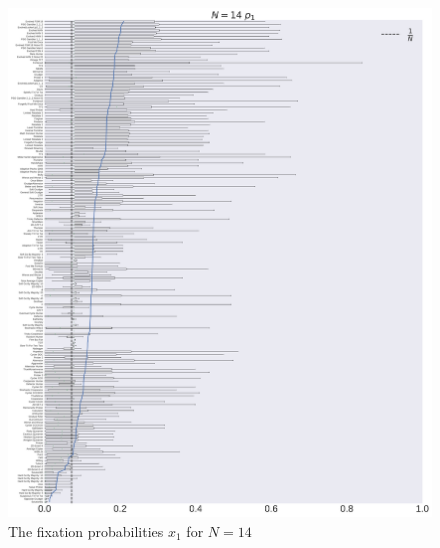 \documentclass[10pt,letterpaper]{article}
\begin{document}
\begin{figure}[!hbtp]
    \centering
    \includegraphics[width=\textwidth]{./boxplot_14_invade.pdf}
    \caption{The fixation probabilities \(x_1\) for \(N=14\)}
    \label{invasion-14}
\end{figure}
\end{document}
